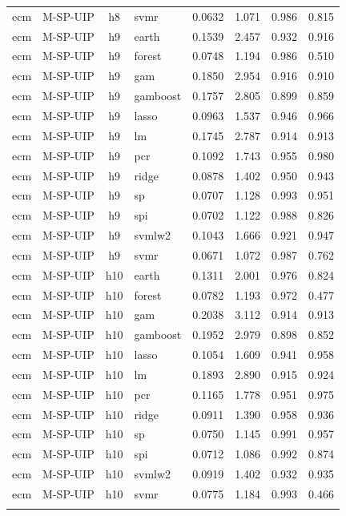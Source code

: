 \begin{ThreePartTable}
\begin{longtable}[t]{llclcccc}
ecm & M-SP-UIP & h8 & svmr & 0.0632 & 1.071 & 0.986 & 0.815\\
\addlinespace
ecm & M-SP-UIP & h9 & earth & 0.1539 & 2.457 & 0.932 & 0.916\\
ecm & M-SP-UIP & h9 & forest & 0.0748 & 1.194 & 0.986 & 0.510\\
ecm & M-SP-UIP & h9 & gam & 0.1850 & 2.954 & 0.916 & 0.910\\
ecm & M-SP-UIP & h9 & gamboost & 0.1757 & 2.805 & 0.899 & 0.859\\
ecm & M-SP-UIP & h9 & lasso & 0.0963 & 1.537 & 0.946 & 0.966\\
ecm & M-SP-UIP & h9 & lm & 0.1745 & 2.787 & 0.914 & 0.913\\
ecm & M-SP-UIP & h9 & pcr & 0.1092 & 1.743 & 0.955 & 0.980\\
ecm & M-SP-UIP & h9 & ridge & 0.0878 & 1.402 & 0.950 & 0.943\\
ecm & M-SP-UIP & h9 & sp & 0.0707 & 1.128 & 0.993 & 0.951\\
ecm & M-SP-UIP & h9 & spi & 0.0702 & 1.122 & 0.988 & 0.826\\
ecm & M-SP-UIP & h9 & svmlw2 & 0.1043 & 1.666 & 0.921 & 0.947\\
ecm & M-SP-UIP & h9 & svmr & 0.0671 & 1.072 & 0.987 & 0.762\\
\addlinespace
ecm & M-SP-UIP & h10 & earth & 0.1311 & 2.001 & 0.976 & 0.824\\
ecm & M-SP-UIP & h10 & forest & 0.0782 & 1.193 & 0.972 & 0.477\\
ecm & M-SP-UIP & h10 & gam & 0.2038 & 3.112 & 0.914 & 0.913\\
ecm & M-SP-UIP & h10 & gamboost & 0.1952 & 2.979 & 0.898 & 0.852\\
ecm & M-SP-UIP & h10 & lasso & 0.1054 & 1.609 & 0.941 & 0.958\\
ecm & M-SP-UIP & h10 & lm & 0.1893 & 2.890 & 0.915 & 0.924\\
ecm & M-SP-UIP & h10 & pcr & 0.1165 & 1.778 & 0.951 & 0.975\\
ecm & M-SP-UIP & h10 & ridge & 0.0911 & 1.390 & 0.958 & 0.936\\
ecm & M-SP-UIP & h10 & sp & 0.0750 & 1.145 & 0.991 & 0.957\\
ecm & M-SP-UIP & h10 & spi & 0.0712 & 1.086 & 0.992 & 0.874\\
ecm & M-SP-UIP & h10 & svmlw2 & 0.0919 & 1.402 & 0.932 & 0.935\\
ecm & M-SP-UIP & h10 & svmr & 0.0775 & 1.184 & 0.993 & 0.466\\
\addlinespace

\end{longtable}
\end{ThreePartTable}
